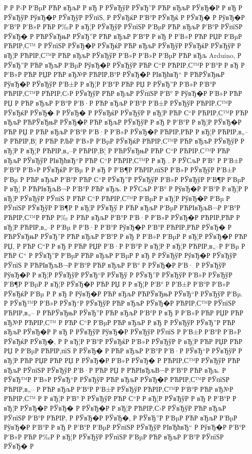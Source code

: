 \documentclass[a4paper,14pt]{extarticle}
\begin{document}
Р  Р Р‹Р  Р’ВµР РЋР вЂљР  Р вЂ Р  РЎвЂўР  РЎвЂ”Р РЋР вЂљР  РЎвЂ�Р  Р вЂ Р  РЎвЂўР  РўвЂ�Р  РЎвЂўР  РЎпїЅ, Р  РЎвЂќР  Р’В°Р  РЎвЂќ Р  РЎвЂ� Р  РўвЂ�Р  Р’В°Р  Р’В»Р РЋР Р‰Р  Р вЂ¦Р  РЎвЂўР  РЎпїЅР  Р’ВµР РЋР вЂљР  Р’В°Р  РЎпїЅР  РЎвЂ� Р РЋРЎвЂњР  РЎвЂ”Р РЋР вЂљР  Р’В°Р  Р вЂ Р  Р’В»Р РЋР РЏР  Р’ВµР РЋРІР‚С™ Р  РЎпїЅР  РЎвЂ�Р  РЎвЂќР РЋР вЂљР  РЎвЂўР  РЎвЂќР  РЎвЂўР  Р вЂ¦Р РЋРІР‚С™Р РЋР вЂљР  РЎвЂўР  Р’В»Р  Р’В»Р  Р’ВµР РЋР вЂљ Arduino, Р  РЎвЂ”Р РЋР вЂљР  Р’ВµР  РўвЂ�Р  РЎвЂўР РЋР С“Р РЋРІР‚С™Р  Р’В°Р  Р вЂ Р  Р’В»Р РЋР РЏР РЋР вЂ№Р РЋРІР‚В°Р  РЎвЂ�Р  РІвЂћвЂ“ Р РЋРЎвЂњР  РўвЂ�Р  РЎвЂўР  Р’В±Р  Р вЂ¦Р  Р’В°Р РЋР РЏ Р  РЎвЂ”Р  Р’В»Р  Р’В°Р РЋРІР‚С™Р РЋРІР‚С›Р  РЎвЂўР РЋР вЂљР  РЎпїЅР  Р’В° Р  РўвЂ�Р  Р’В»Р РЋР РЏ Р РЋР вЂљР  Р’В°Р  Р’В·Р РЋР вЂљР  Р’В°Р  Р’В±Р  РЎвЂўР РЋРІР‚С™Р  РЎвЂќР  РЎвЂ� Р  РЎвЂ� Р  РЎвЂќР  РЎвЂўР  Р вЂ¦Р РЋР С“Р РЋРІР‚С™Р РЋР вЂљР РЋРЎвЂњР  РЎвЂ�Р РЋР вЂљР  РЎвЂўР  Р вЂ Р  Р’В°Р  Р вЂ¦Р  РЎвЂ�Р РЋР РЏ Р РЋР вЂљР  Р’В°Р  Р’В·Р  Р’В»Р  РЎвЂ�Р РЋРІР‚РЋР  Р вЂ¦Р РЋРІР‚в„–Р РЋРІР‚В¦ Р РЋР РЉР  Р’В»Р  Р’ВµР  РЎвЂќР РЋРІР‚С™Р РЋР вЂљР  РЎвЂўР  Р вЂ¦Р  Р вЂ¦Р РЋРІР‚в„–Р РЋРІР‚В¦ Р РЋРЎвЂњР РЋР С“Р РЋРІР‚С™Р РЋР вЂљР  РЎвЂўР  РІвЂћвЂ“Р РЋР С“Р РЋРІР‚С™Р  Р вЂ . Р  РЎСљР  Р’В° Р  Р’В±Р  Р’В°Р  Р’В»Р  РЎвЂќР  Р’Вµ Р  Р вЂ  Р  Р’В¶Р РЋРІР‚пїЅР  Р’В»Р  РЎвЂўР  Р’В±Р  Р’Вµ Р РЋР вЂљР  Р’В°Р РЋР С“Р  РЎвЂ”Р  РЎвЂўР  Р’В»Р  РЎвЂўР  Р’В¶Р  Р’ВµР  Р вЂ¦ Р РЋРІвЂљВ¬Р  Р’В°Р РЋР вЂљ. Р  РЎСљР  Р’В° Р  РўвЂ�Р  Р’В°Р  Р вЂ¦Р  Р вЂ¦Р  РЎвЂўР  РЎпїЅ Р РЋР С“Р РЋРІР‚С™Р  Р’ВµР  Р вЂ¦Р  РўвЂ�Р  Р’Вµ Р  РЎпїЅР  РЎвЂўР  Р’В¶Р  Р вЂ¦Р  РЎвЂў Р РЋР вЂљР  Р’ВµР РЋРІвЂљВ¬Р  Р’В°Р РЋРІР‚С™Р РЋР Р‰ Р РЋР вЂљР  Р’В°Р  Р’В·Р  Р’В»Р  РЎвЂ�Р РЋРІР‚РЋР  Р вЂ¦Р РЋРІР‚в„–Р  Р’Вµ Р  Р’В·Р  Р’В°Р  РўвЂ�Р  Р’В°Р РЋРІР‚РЋР  РЎвЂ� Р РЋРЎвЂњР  РЎвЂ”Р РЋР вЂљР  Р’В°Р  Р вЂ Р  Р’В»Р  Р’ВµР  Р вЂ¦Р  РЎвЂ�Р РЋР РЏ, Р РЋР С“Р  Р вЂ Р РЋР РЏР  Р’В·Р  Р’В°Р  Р вЂ¦Р  Р вЂ¦Р РЋРІР‚в„–Р  Р’Вµ Р РЋР С“ Р  РЎвЂ”Р  Р’ВµР РЋР вЂљР  Р’ВµР  Р вЂ Р  РЎвЂўР  РўвЂ�Р  РЎвЂўР  РЎпїЅ Р РЋРІвЂљВ¬Р  Р’В°Р РЋР вЂљР  Р’В° Р  РЎвЂ�Р  Р’В· Р  РЎвЂўР  РўвЂ�Р  Р вЂ¦Р  РЎвЂўР  РЎвЂ“Р  РЎвЂў Р  РЎвЂ”Р  РЎвЂўР  Р’В»Р  РЎвЂўР  Р’В¶Р  Р’ВµР  Р вЂ¦Р  РЎвЂ�Р РЋР РЏ Р  Р вЂ¦Р  Р’В° Р  Р’В±Р  Р’В°Р  Р’В»Р  РЎвЂќР  Р’Вµ Р  Р вЂ  Р  РўвЂ�Р РЋР вЂљР РЋРЎвЂњР  РЎвЂ“Р  РЎвЂўР  Р’Вµ. Р  РЎвЂ™Р  Р’В»Р  РЎвЂ“Р  РЎвЂўР РЋР вЂљР  РЎвЂ�Р РЋРІР‚С™Р  РЎпїЅР РЋРІР‚в„– Р РЋРЎвЂњР  РЎвЂ”Р РЋР вЂљР  Р’В°Р  Р вЂ Р  Р’В»Р РЋР РЏР РЋР вЂ№Р РЋРІР‚С™ Р РЋР С“Р  Р’ВµР РЋР вЂљР  Р вЂ Р  РЎвЂўР  РЎвЂ”Р РЋР вЂљР  РЎвЂ�Р  Р вЂ Р  РЎвЂўР  РўвЂ�Р  РЎвЂўР  РЎпїЅ Р  Р’В±Р  Р’В°Р  Р’В»Р  РЎвЂќР  РЎвЂ�, Р  Р вЂ¦Р  Р’В°Р  РЎвЂќР  Р’В»Р  РЎвЂўР  Р вЂ¦Р РЋР РЏР РЋР РЏ Р  Р’ВµР РЋРІР‚пїЅ Р  РЎвЂ� Р РЋР вЂљР  Р’В°Р  Р’В·Р  РЎвЂ“Р  РЎвЂўР  Р вЂ¦Р РЋР РЏР РЋР РЏ Р  РЎвЂ�Р  Р’В»Р  РЎвЂ� Р РЋРІР‚С™Р  РЎвЂўР РЋР вЂљР  РЎпїЅР  РЎвЂўР  Р’В·Р РЋР РЏ Р РЋРІвЂљВ¬Р  Р’В°Р РЋР вЂљ. Р  РЎвЂ™Р  Р’В»Р  РЎвЂ“Р  РЎвЂўР РЋР вЂљР  РЎвЂ�Р РЋРІР‚С™Р  РЎпїЅР РЋРІР‚в„– Р РЋР вЂљР  Р’В°Р  Р’В±Р  РЎвЂўР РЋРІР‚С™Р  Р’В°Р РЋР вЂ№Р РЋРІР‚С™ Р  Р вЂ¦Р  Р’В° Р  РЎвЂўР РЋР С“Р  Р вЂ¦Р  РЎвЂўР  Р вЂ Р  Р’В°Р  Р вЂ¦Р  РЎвЂ�Р  РЎвЂ� Р  РЎвЂ�Р  Р вЂ¦Р РЋРІР‚С›Р  РЎвЂўР РЋР вЂљР  РЎпїЅР  Р’В°Р РЋРІР‚ Р  РЎвЂ�Р  РЎвЂ�, Р  РЎвЂ”Р  Р’ВµР РЋР вЂљР  Р’ВµР  РўвЂ�Р  Р’В°Р  Р вЂ Р  Р’В°Р  Р’ВµР  РЎпїЅР  РЎвЂўР  РІвЂћвЂ“ Р  РўвЂ�Р  Р’В°Р  Р’В»Р РЋР Р‰Р  Р вЂ¦Р  РЎвЂўР  РЎпїЅР  Р’ВµР РЋР вЂљР  Р’В°Р  РЎпїЅР  РЎвЂ� Р  
\end{document}
